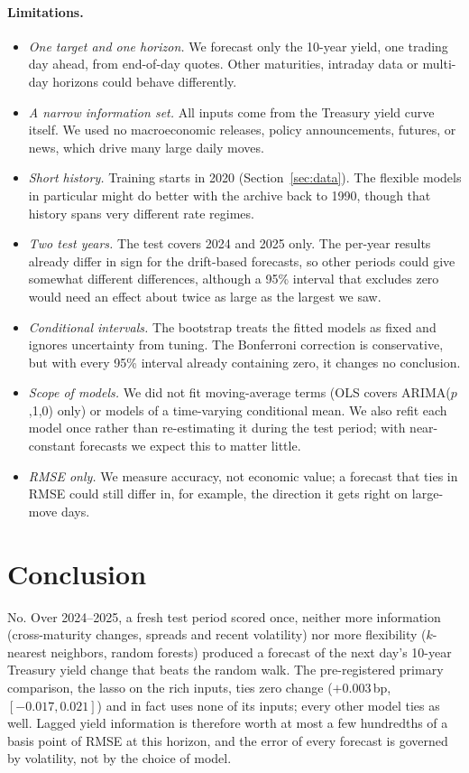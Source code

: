 \documentclass{article}
\begin{document}
\paragraph{Limitations.}
\begin{itemize}[leftmargin=*]
  \item \emph{One target and one horizon.} We forecast only the 10-year yield, one trading day ahead, from end-of-day quotes. Other maturities, intraday data or multi-day horizons could behave differently.
  \item \emph{A narrow information set.} All inputs come from the Treasury yield curve itself. We used no macroeconomic releases, policy announcements, futures, or news, which drive many large daily moves.
  \item \emph{Short history.} Training starts in 2020 (Section~\ref{sec:data}). The flexible models in particular might do better with the archive back to 1990, though that history spans very different rate regimes.
  \item \emph{Two test years.} The test covers 2024 and 2025 only. The per-year results already differ in sign for the drift-based forecasts, so other periods could give somewhat different differences, although a 95\% interval that excludes zero would need an effect about twice as large as the largest we saw.
  \item \emph{Conditional intervals.} The bootstrap treats the fitted models as fixed and ignores uncertainty from tuning. The Bonferroni correction is conservative, but with every 95\% interval already containing zero, it changes no conclusion.
  \item \emph{Scope of models.} We did not fit moving-average terms (OLS covers ARIMA($p$,1,0) only) or models of a time-varying conditional mean. We also refit each model once rather than re-estimating it during the test period; with near-constant forecasts we expect this to matter little.
  \item \emph{RMSE only.} We measure accuracy, not economic value; a forecast that ties in RMSE could still differ in, for example, the direction it gets right on large-move days.
\end{itemize}

\section{Conclusion}
No. Over 2024--2025, a fresh test period scored once, neither more information (cross-maturity changes, spreads and recent volatility) nor more flexibility ($k$-nearest neighbors, random forests) produced a forecast of the next day's 10-year Treasury yield change that beats the random walk. The pre-registered primary comparison, the lasso on the rich inputs, ties zero change ($+0.003$\,bp, $[-0.017, 0.021]$) and in fact uses none of its inputs; every other model ties as well. Lagged yield information is therefore worth at most a few hundredths of a basis point of RMSE at this horizon, and the error of every forecast is governed by volatility, not by the choice of model.
\end{document}
